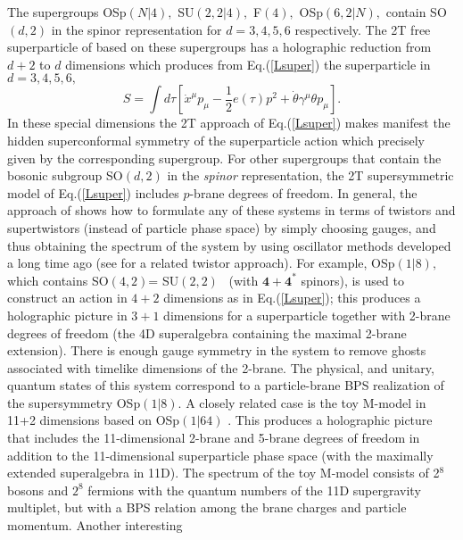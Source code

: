 \documentclass[a4paper,12pt]{article}
\begin{document}
The supergroups OSp$\left( N|4\right) ,$ SU$\left( 2,2|4\right) ,$
F$\left( 4\right) ,$ OSp$\left( 6,2|N\right) ,$ contain SO$\left(
d,2\right) $ in the spinor representation for $d=3,4,5,6$
respectively. The 2T free superparticle of \cite{super2t} based on
these supergroups has a holographic reduction from $d+2$ to $d$
dimensions which produces from Eq.(\ref{Lsuper}) the
superparticle in $d=3,4,5,6,$
\begin{equation}
S=\int d\tau \left[ \dot{x}^{\mu }p_{\mu }-\frac{1}{2}e\left( \tau \right)
p^{2}+\dot{\theta}\gamma ^{\mu }\theta p_{\mu }\right] .
\end{equation}
In these special dimensions the 2T approach of Eq.(\ref{Lsuper})
makes manifest the hidden superconformal symmetry of the
superparticle action which precisely given by the corresponding
supergroup. For other supergroups that contain the bosonic
subgroup SO$\left( d,2\right) $ in the \textit{ spinor
}representation, the 2T supersymmetric model of Eq.(\ref{Lsuper})
includes $p$-brane degrees of freedom. In general, the approach of
\cite {super2t} shows how to formulate any of these systems in
terms of twistors and supertwistors (instead of particle phase
space) by simply choosing gauges, and thus obtaining the spectrum
of the system by using oscillator methods developed a long time
ago \cite{barsgunaydin} (see \cite{lukierski} for a related
twistor approach). For example, OSp$\left( 1|8\right) ,$ which
contains SO$\left( 4,2\right) $= SU$\left( 2,2\right) $ \ (with
$\mathbf{4+4} ^{\ast }$ spinors), is used to construct an action
in $4+2$ dimensions as in Eq.(\ref{Lsuper}); this produces a
holographic picture in $3+1$ dimensions for a superparticle
together with 2-brane degrees of freedom (the 4D superalgebra
containing the maximal 2-brane extension). There is enough gauge
symmetry in the system to remove ghosts associated with timelike
dimensions of the 2-brane. The physical, and unitary, quantum
states of this system correspond to a particle-brane BPS
realization of the supersymmetry OSp$\left( 1|8\right) .$ A
closely related case is the toy M-model in 11+2 dimensions based
on OSp$\left( 1|64\right) $ \cite{super2t}\cite{survey2T}. This
produces a holographic picture that includes the 11-dimensional
2-brane and 5-brane degrees of freedom in addition to the
11-dimensional superparticle phase space (with the maximally
extended superalgebra in 11D). The spectrum of the toy M-model
consists of 2$^{8}$ bosons and $2^{8}$ fermions with the quantum
numbers of the 11D supergravity multiplet, but with a BPS relation
among the brane charges and particle momentum. Another interesting
\end{document}
